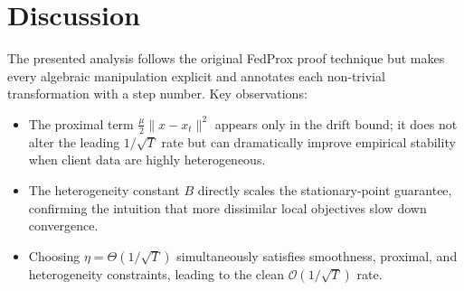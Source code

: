 \documentclass{article}
\begin{document}
\section*{Discussion}
The presented analysis follows the original FedProx proof technique but makes every algebraic manipulation explicit and annotates each non‑trivial transformation with a step number.  
Key observations:
\begin{itemize}[leftmargin=*]
    \item The proximal term $\frac{\mu}{2}\|x-x_t\|^{2}$ appears only in the drift bound; it does not alter the leading $1/\sqrt{T}$ rate but can dramatically improve empirical stability when client data are highly heterogeneous.
    \item The heterogeneity constant $B$ directly scales the stationary‑point guarantee, confirming the intuition that more dissimilar local objectives slow down convergence.
    \item Choosing $\eta = \Theta(1/\sqrt{T})$ simultaneously satisfies smoothness, proximal, and heterogeneity constraints, leading to the clean $\mathcal{O}(1/\sqrt{T})$ rate.
\end{itemize}
\end{document}
